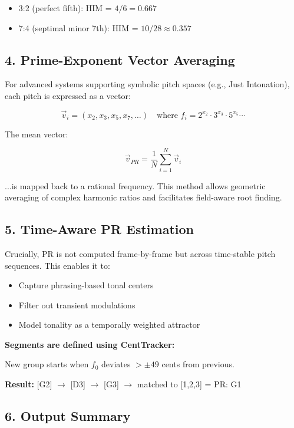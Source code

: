 \begin{itemize}
    \item 3:2 (perfect fifth): HIM = $4/6 = 0.667$
    \item 7:4 (septimal minor 7th): HIM = $10/28 \approx 0.357$
\end{itemize}

\subsection*{4. Prime-Exponent Vector Averaging}

For advanced systems supporting symbolic pitch spaces (e.g., Just Intonation), each pitch is expressed as a vector:

\[
\vec{v}_i = (x_2, x_3, x_5, x_7, \ldots) \quad \text{where } f_i = 2^{x_2} \cdot 3^{x_3} \cdot 5^{x_5} \cdots
\]

The mean vector:

\[
\vec{v}_{PR} = \frac{1}{N} \sum_{i=1}^N \vec{v}_i
\]

...is mapped back to a rational frequency. This method allows geometric averaging of complex harmonic ratios and facilitates field-aware root finding.

\subsection*{5. Time-Aware PR Estimation}

Crucially, PR is not computed frame-by-frame but across time-stable pitch sequences. This enables it to:

\begin{itemize}
    \item Capture phrasing-based tonal centers
    \item Filter out transient modulations
    \item Model tonality as a temporally weighted attractor
\end{itemize}

\textbf{Segments are defined using CentTracker:}

New group starts when $f_0$ deviates $> \pm49$ cents from previous.

\textbf{Result:} [G2] $\rightarrow$ [D3] $\rightarrow$ [G3] $\rightarrow$ matched to [1,2,3] = PR: G1

\subsection*{6. Output Summary}

